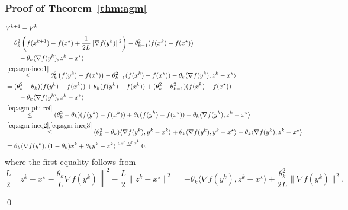 \documentclass[10pt,mathserif]{beamer}
\begin{document}
\begin{frame}
\frametitle{Proof of Theorem~\ref{thm:agm}}
\vspace{-0.2in}
\begingroup\makeatletter{}\check@mathfonts
\begin{align*}
&V^{k+1}-V^k\\
&=
\theta_{k}^2
\left(f(x^{k+1})-f(x^\star)
+\frac{1}{2L}\|\nabla f(y^k)\|^2
\right)
-
\theta_{k-1}^2(f(x^{k})-f(x^\star))\\
&\qquad
-\theta_k\langle \nabla f(y^k),z^k-x^\star\rangle\\
&\stackrel{\eqref{eq:agm-ineq1}}{\le}
\theta_{k}^2
\left(f(y^k)-f(x^\star)
\right)
-
\theta_{k-1}^2(f(x^{k})-f(x^\star))
-\theta_k\langle \nabla f(y^k),z^k-x^\star\rangle\\
&=
(\theta_k^2-\theta_k)(f(y^k)-f(x^k))+\theta_k(f(y^k)-f(x^k))+(\theta_k^2-\theta_{k-1}^2)(f(x^k)-f(x^\star))\\
&\qquad-\theta_k\langle \nabla f(y^k),z^k-x^\star\rangle\\
&\stackrel{\eqref{eq:agm-phi-rel}}{\le}
(\theta_k^2-\theta_k)(f(y^k)-f(x^k))+\theta_k(f(y^k)-f(x^\star))-\theta_k\langle \nabla f(y^k),z^k-x^\star\rangle\\
&\stackrel{\eqref{eq:agm-ineq2}, \eqref{eq:agm-ineq3}}{\le}
(\theta_k^2-\theta_k)\langle \nabla f(y^k),y^k-x^k\rangle
+
\theta_{k}\langle \nabla f(y^k),y^k-x^\star\rangle
-\theta_k\langle \nabla f(y^k),z^k-x^\star\rangle\\
&=
\theta_k\langle \nabla f(y^k),(1-\theta_{k})x^k+\theta_ky^k-z^k\rangle
\stackrel{\text{def.\ of } z^{k}}{=}0,
\end{align*}
\endgroup
where the first equality follows from
\begingroup\makeatletter\def\f@size{9}\check@mathfonts
\[
\frac{L}{2}\left\|z^k-x^\star-\frac{\theta_k}{L}\nabla f(y^k)\right\|^2-\frac{L}{2}\|z^k-x^\star\|^2=
-\theta_k\langle \nabla f(y^k),z^k-x^\star\rangle+
\frac{\theta_k^2}{2L}\|\nabla f(y^k)\|^2.
\]
\endgroup

\vspace{-0.20in}
\qed
\end{frame}
\end{document}

